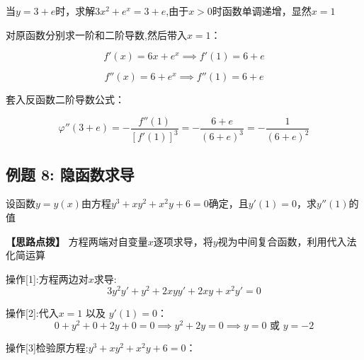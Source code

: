 \documentclass[11pt,a4paper,UTF8]{ctexart}
\begin{document}
\begin{solbox}[分步推导与答题规范]
  当$y = 3+e$时，求解$3x^2 + e^x = 3+e$,由于$x>0$时函数单调递增，显然$x = 1$
\end{solbox}

对原函数分别求一阶和二阶导数,然后带入$x=1$：

\begin{solbox}[分步推导与答题规范]
  
\begin{equation*}
f'(x) = 6x + e^x \implies f'(1) = 6 + e
\end{equation*}


  
\begin{equation*}
f''(x) = 6 + e^x \implies f''(1) = 6 + e
\end{equation*}

\end{solbox}

套入反函数二阶导数公式：

\begin{solbox}[分步推导与答题规范]
  
\begin{equation*}
\varphi''(3+e) = -\frac{f''(1)}{[f'(1)]^3} = -\frac{6+e}{(6+e)^3} = -\frac{1}{(6+e)^2}
\end{equation*}

\end{solbox}


\subsection{例题 8: 隐函数求导}

设函数$y = y(x)$由方程$y^3 + xy^2 + x^2y + 6 = 0$确定，且$y'(1) = 0$，求$y''(1)$的值

\textbf{\color{DeepPurple}【思路点拨】} 方程两端对自变量$x$逐项求导，将$y$视为中间复合函数，利用代入法化简运算


操作[1]:方程两边对$x$求导:		
\begin{equation*}
3y^2y' + y^2 + 2xyy' + 2xy + x^2y' = 0
\end{equation*}


操作[2]:代入$x=1$ 以及 $y'(1)=0$：       
\begin{equation*}
0 + y^2 + 0 + 2y + 0 = 0 \implies y^2 + 2y = 0 \implies y = 0 \text{ 或 } y = -2
\end{equation*}


操作[3]检验原方程:$y^3 + xy^2 + x^2y + 6 = 0$：
\end{document}
